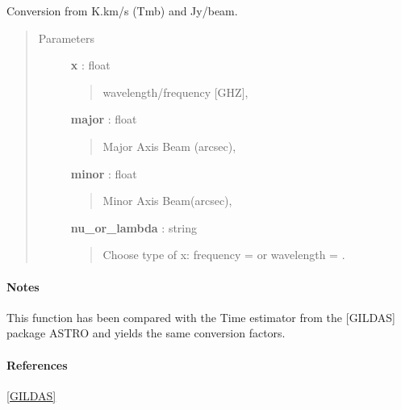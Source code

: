 \documentclass[a4paper,10pt,english]{sphinxmanual}
\begin{document}
\begin{fulllineitems}
\label{functions:astrolyze.functions.units.kelvin_to_jansky}
Conversion from K.km/s (Tmb) and Jy/beam.
\begin{quote}\begin{description}
\item[{Parameters }] \leavevmode
\textbf{x} : float
\begin{quote}

wavelength/frequency {[}GHZ{]},
\end{quote}

\textbf{major} : float
\begin{quote}

Major Axis Beam (arcsec),
\end{quote}

\textbf{minor} : float
\begin{quote}

Minor Axis Beam(arcsec),
\end{quote}

\textbf{nu\_or\_lambda} : string
\begin{quote}

Choose type of x: frequency =  or wavelength = .
\end{quote}

\end{description}\end{quote}
\paragraph{Notes}

This function has been compared with the Time estimator from the
{[}GILDAS{]} package ASTRO and yields the same conversion factors.
\paragraph{References}

{\hyperref[manual:gildas]{{[}GILDAS{]}}}

\end{fulllineitems}

\end{document}
